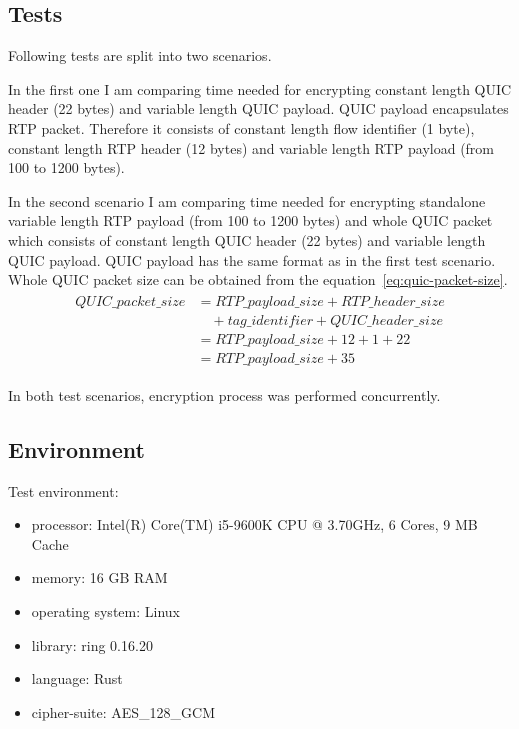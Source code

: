 \subsection{Tests}
\label{subsec:tests3}
Following tests are split into two scenarios.

In the first one I am comparing time needed for encrypting constant length QUIC header (22 bytes) and variable length QUIC payload.
QUIC payload encapsulates RTP packet.
Therefore it consists of constant length flow identifier (1 byte), constant length RTP header (12 bytes) and variable length RTP payload (from 100 to 1200 bytes).

In the second scenario I am comparing time needed for encrypting standalone variable length RTP payload (from 100 to 1200 bytes)
and whole QUIC packet which consists of constant length QUIC header (22 bytes) and variable length QUIC payload.
QUIC payload has the same format as in the first test scenario.
Whole QUIC packet size can be obtained from the equation~\ref{eq:quic-packet-size}.
\begin{align}
    \begin{split}
        QUIC\_packet\_size & = RTP\_payload\_size + RTP\_header\_size \\
        & \quad + tag\_identifier + QUIC\_header\_size \\
        & = RTP\_payload\_size + 12 + 1 + 22 \\
        & = RTP\_payload\_size + 35
    \end{split}
    \label{eq:quic-packet-size}
\end{align}

In both test scenarios, encryption process was performed concurrently.

\subsection{Environment}
\label{subsec:environment}
Test environment:
\begin{itemize}
    \item processor: Intel(R) Core(TM) i5-9600K CPU @ 3.70GHz, 6 Cores, 9 MB Cache
    \item memory: 16 GB RAM
    \item operating system: Linux
    \item library: ring 0.16.20
    \item language: Rust
    \item cipher-suite: AES\_128\_GCM
\end{itemize}

